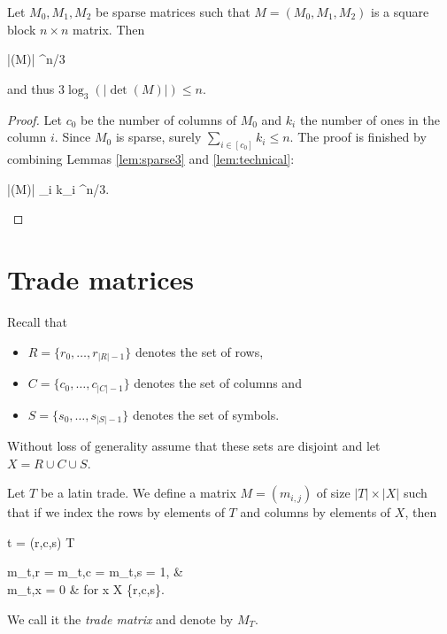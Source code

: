 \begin{lem}
Let $M_0,M_1,M_2$ be sparse matrices such that $M = (M_0,M_1,M_2)$ is a  square block $n \times n$ matrix. Then
\begin{cosyeqnarray}
 	|\det(M)| ^{n/3}
\end{cosyeqnarray}%
and thus $3 \log_3(|\det(M)|) \leq n$.
\end{lem}
\begin{proof}
Let $c_0$ be the number of columns of $M_0$ and $k_i$ the number of ones in the column $i$. Since $M_0$ is sparse, surely $\sum_{i \in [c_0]} k_i \leq n$. The proof is finished by combining Lemmas \ref{lem:sparse3} and \ref{lem:technical}:
\begin{cosyeqnarray}
	|\det(M)| \leq \prod_{i \in [c_0]} k_i ^{n/3}.
\end{cosyeqnarray}%
\end{proof}

\section{Trade matrices}
Recall that
\begin{itemize}
	\item $R = \{r_0,\dots,r_{|R|-1}\}$ denotes the set of rows,
	\item $C = \{c_0,\dots,c_{|C|-1}\}$ denotes the set of columns and
	\item $S = \{s_0,\dots,s_{|S|-1}\}$ denotes the set of symbols.
\end{itemize}
Without loss of generality assume that these sets are disjoint and let $X = R \cup C \cup S$.

\begin{defn}
Let $T$ be a latin trade. We define a matrix $M = (m_{i,j})$ of size $|T| \times |X|$ such that if we index the rows by elements of $T$ and columns by elements of $X$, then
\begin{cosyeqnarray}
	t = (r,c,s) \in T \Rightarrow
	\begin{cases}
		m_{t,r} = m_{t,c} = m_{t,s} = 1, & \\
		m_{t,x} = 0 & \textrm{ for } x \in X \setminus \{r,c,s\}.
	\end{cases}
\end{cosyeqnarray}%
\end{defn}
We call it the \emph{trade matrix} and denote by $M_T$.

